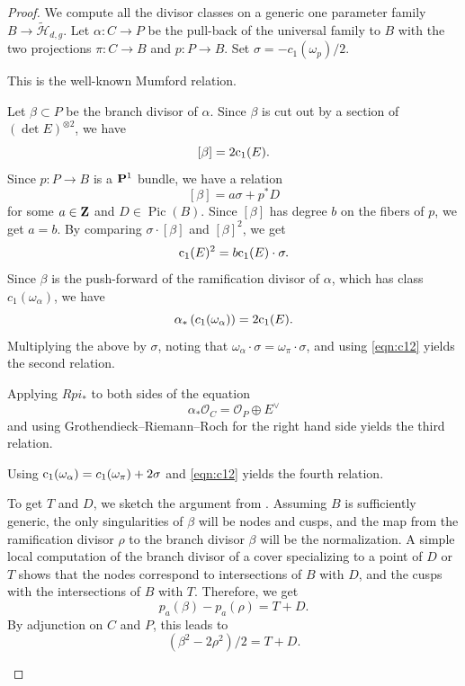 \documentclass{amsart}
\renewcommand{\c}{{\rm c}}
\newcommand{\orb}{\mathcal}
\renewcommand{\O}{{\mathcal O}}
\providecommand {\Z}{{\bf Z}}
\renewcommand {\P}{{\bf P}}
\providecommand {\from}{{\colon}}
\providecommand{\Pic}{\operatorname{Pic}}
\numberwithin{equation}{section}
\begin{document}
\begin{proof}
  We compute all the divisor classes on a generic one parameter family $B \to \widetilde {\orb H}_{d,g}$.
  Let $\alpha \from C \to P$ be the pull-back of the universal family to $B$ with the two projections $\pi \from C \to B$ and $p \from P \to B$.
  Set $\sigma = -c_1(\omega_p)/2$.
  \begin{asparaenum}
  \item[(1)] This is the well-known Mumford relation.
  \item[(2)] Let $\beta \subset P$ be the branch divisor of $\alpha$.
    Since $\beta$ is cut out by a section of $(\det E)^{\otimes 2}$, we have 
    \[ [\beta] = 2\c_1(E).\]
    Since $p \from P \to B$ is a $\P^1$ bundle, we have a relation
    \[ [\beta] = a \sigma + p^* D\]
    for some $a \in \Z$ and $D \in \Pic(B)$.
    Since $[\beta]$ has degree $b$ on the fibers of $p$, we get $a = b$.
    By comparing $\sigma \cdot [\beta]$ and $[\beta]^2$, we get
    \begin{equation}\label{eqn:c12}
      \c_1(E)^2 = b \c_1(E) \cdot \sigma.
    \end{equation}
    Since $\beta$ is the push-forward of the ramification divisor of $\alpha$, which has class $c_1(\omega_\alpha)$, we have
    \[ \alpha_* \left(c_1(\omega_\alpha) \right) = 2\c_1(E).\]
    Multiplying the above by $\sigma$, noting that $\omega_\alpha \cdot \sigma = \omega_\pi \cdot \sigma$, and using \eqref{eqn:c12} yields the second relation.
  \item[(3)] Applying $Rpi_*$ to both sides of the equation
    \[ \alpha_* \O_C = \O_P \oplus E^\vee\]
    and using Grothendieck--Riemann--Roch for the right hand side yields the third relation.
  \item[(4)] Using $\c_1(\omega_\alpha) = c_1(\omega_\pi) + 2\sigma$ and \eqref{eqn:c12} yields the fourth relation.
  \item[(5, 6)]
    To get $T$ and $D$, we sketch the argument from \cite[Proposition~3.2]{pat:15}.
    Assuming $B$ is sufficiently generic, the only singularities of $\beta$ will be nodes and cusps, and the map from the ramification divisor $\rho$ to the branch divisor $\beta$ will be the normalization.
    A simple local computation of the branch divisor of a cover specializing to a point of $D$ or $T$ shows that the nodes correspond to intersections of $B$ with $D$, and the cusps with the intersections of $B$ with $T$.
    Therefore, we get
    \[ p_a(\beta) - p_a(\rho) = T + D.\]
    By adjunction on $C$ and $P$, this leads to 
    \[ (\beta^2 - 2\rho^2)/2 = T + D.\]

\end{asparaenum}
\end{proof}
\end{document}
